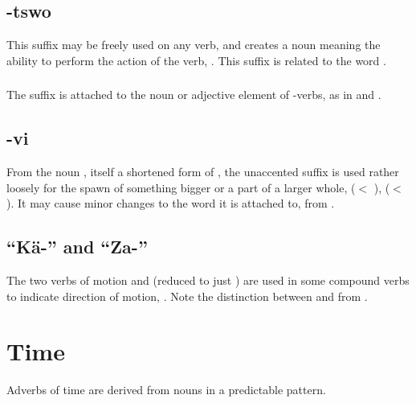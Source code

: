 \subsection{-tswo} This suffix may be freely used on any verb, and
creates a noun meaning the ability to perform the action of the verb,
   .
This suffix is related to the word  .

\subsubsection{} The suffix  is attached to the noun or
adjective element of -verbs, as in   and  .

\subsection{-vi} From the noun , itself a shortened form of
 , the unaccented suffix  is used rather
loosely for the spawn of something bigger or a part of a larger whole,
  ($<$  ), 
 ($<$  ).  It may
cause minor changes to the word it is attached to, 
 from  .

\subsection{``Kä-'' and ``Za-''} The two verbs of motion  
and   (reduced to just ) are used in some
compound verbs to indicate direction of motion, 
.  Note the distinction between  
and   from  .


\section{Time}
\noindent Adverbs of time are derived from nouns in a predictable
pattern.

